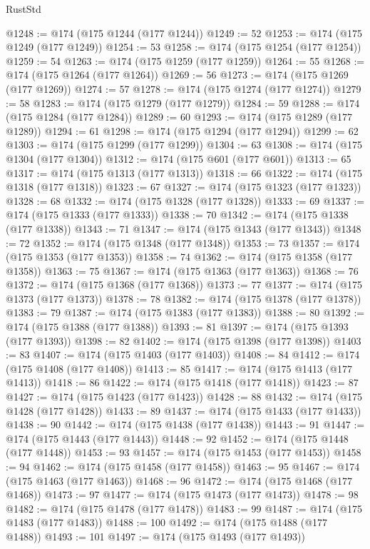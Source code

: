 \begin{lexlean}{RustStd}
\begin{coremodule}
@1248 := @174 (@175 @1244 (@177 @1244))
@1249 := 52
@1253 := @174 (@175 @1249 (@177 @1249))
@1254 := 53
@1258 := @174 (@175 @1254 (@177 @1254))
@1259 := 54
@1263 := @174 (@175 @1259 (@177 @1259))
@1264 := 55
@1268 := @174 (@175 @1264 (@177 @1264))
@1269 := 56
@1273 := @174 (@175 @1269 (@177 @1269))
@1274 := 57
@1278 := @174 (@175 @1274 (@177 @1274))
@1279 := 58
@1283 := @174 (@175 @1279 (@177 @1279))
@1284 := 59
@1288 := @174 (@175 @1284 (@177 @1284))
@1289 := 60
@1293 := @174 (@175 @1289 (@177 @1289))
@1294 := 61
@1298 := @174 (@175 @1294 (@177 @1294))
@1299 := 62
@1303 := @174 (@175 @1299 (@177 @1299))
@1304 := 63
@1308 := @174 (@175 @1304 (@177 @1304))
@1312 := @174 (@175 @601 (@177 @601))
@1313 := 65
@1317 := @174 (@175 @1313 (@177 @1313))
@1318 := 66
@1322 := @174 (@175 @1318 (@177 @1318))
@1323 := 67
@1327 := @174 (@175 @1323 (@177 @1323))
@1328 := 68
@1332 := @174 (@175 @1328 (@177 @1328))
@1333 := 69
@1337 := @174 (@175 @1333 (@177 @1333))
@1338 := 70
@1342 := @174 (@175 @1338 (@177 @1338))
@1343 := 71
@1347 := @174 (@175 @1343 (@177 @1343))
@1348 := 72
@1352 := @174 (@175 @1348 (@177 @1348))
@1353 := 73
@1357 := @174 (@175 @1353 (@177 @1353))
@1358 := 74
@1362 := @174 (@175 @1358 (@177 @1358))
@1363 := 75
@1367 := @174 (@175 @1363 (@177 @1363))
@1368 := 76
@1372 := @174 (@175 @1368 (@177 @1368))
@1373 := 77
@1377 := @174 (@175 @1373 (@177 @1373))
@1378 := 78
@1382 := @174 (@175 @1378 (@177 @1378))
@1383 := 79
@1387 := @174 (@175 @1383 (@177 @1383))
@1388 := 80
@1392 := @174 (@175 @1388 (@177 @1388))
@1393 := 81
@1397 := @174 (@175 @1393 (@177 @1393))
@1398 := 82
@1402 := @174 (@175 @1398 (@177 @1398))
@1403 := 83
@1407 := @174 (@175 @1403 (@177 @1403))
@1408 := 84
@1412 := @174 (@175 @1408 (@177 @1408))
@1413 := 85
@1417 := @174 (@175 @1413 (@177 @1413))
@1418 := 86
@1422 := @174 (@175 @1418 (@177 @1418))
@1423 := 87
@1427 := @174 (@175 @1423 (@177 @1423))
@1428 := 88
@1432 := @174 (@175 @1428 (@177 @1428))
@1433 := 89
@1437 := @174 (@175 @1433 (@177 @1433))
@1438 := 90
@1442 := @174 (@175 @1438 (@177 @1438))
@1443 := 91
@1447 := @174 (@175 @1443 (@177 @1443))
@1448 := 92
@1452 := @174 (@175 @1448 (@177 @1448))
@1453 := 93
@1457 := @174 (@175 @1453 (@177 @1453))
@1458 := 94
@1462 := @174 (@175 @1458 (@177 @1458))
@1463 := 95
@1467 := @174 (@175 @1463 (@177 @1463))
@1468 := 96
@1472 := @174 (@175 @1468 (@177 @1468))
@1473 := 97
@1477 := @174 (@175 @1473 (@177 @1473))
@1478 := 98
@1482 := @174 (@175 @1478 (@177 @1478))
@1483 := 99
@1487 := @174 (@175 @1483 (@177 @1483))
@1488 := 100
@1492 := @174 (@175 @1488 (@177 @1488))
@1493 := 101
@1497 := @174 (@175 @1493 (@177 @1493))

\end{coremodule}
\end{lexlean}
